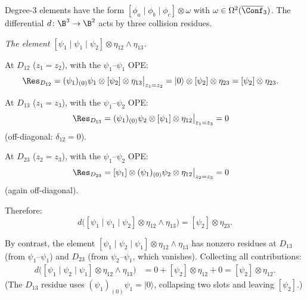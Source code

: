 \begin{computation}
\label{comp:fermion-deg3}
Degree-3 elements have the form
$[\phi_a \mid \phi_b \mid \phi_c] \otimes \omega$
with $\omega \in \Omega^2(\overline{\Conf}_3)$.
The differential $d\colon \B^3 \to \B^2$ acts by three collision residues.

\emph{The element $[\psi_1 \mid \psi_1 \mid \psi_2]
\otimes \eta_{12} \wedge \eta_{13}$.}

At $D_{12}$ ($z_1 = z_2$), with the $\psi_1$--$\psi_1$ OPE:
\begin{align*}
\Res_{D_{12}} &= (\psi_1)_{(0)}\psi_1 \otimes [\psi_2]
\otimes \eta_{13}\big|_{z_1 = z_2}
= |0\rangle \otimes [\psi_2] \otimes \eta_{23}
= [\psi_2] \otimes \eta_{23}.
\end{align*}

At $D_{13}$ ($z_1 = z_3$), with the $\psi_1$--$\psi_2$ OPE:
\begin{align*}
\Res_{D_{13}} &= (\psi_1)_{(0)}\psi_2 \otimes [\psi_1]
\otimes \eta_{12}\big|_{z_1 = z_3}
= 0
\end{align*}
(off-diagonal: $\delta_{12} = 0$).

At $D_{23}$ ($z_2 = z_3$), with the $\psi_1$--$\psi_2$ OPE:
\begin{align*}
\Res_{D_{23}} &= [\psi_1] \otimes (\psi_1)_{(0)}\psi_2
\otimes \eta_{12}\big|_{z_2 = z_3}
= 0
\end{align*}
(again off-diagonal).

Therefore:
\begin{equation}\label{eq:fermion-deg3-ex}
d\bigl([\psi_1 \mid \psi_1 \mid \psi_2]
\otimes \eta_{12} \wedge \eta_{13}\bigr)
= [\psi_2] \otimes \eta_{23}.
\end{equation}

By contrast, the element $[\psi_1 \mid \psi_2 \mid \psi_1]
\otimes \eta_{12} \wedge \eta_{13}$ has nonzero residues at
$D_{13}$ (from $\psi_1$--$\psi_1$) and $D_{23}$ (from $\psi_2$--$\psi_1$,
which vanishes).  Collecting all contributions:
\begin{align*}
d\bigl([\psi_1 \mid \psi_2 \mid \psi_1]
\otimes \eta_{12} \wedge \eta_{13}\bigr)
&= 0 + [\psi_2] \otimes \eta_{12} + 0
= [\psi_2] \otimes \eta_{12}.
\end{align*}
(The $D_{13}$ residue uses $(\psi_1)_{(0)}\psi_1 = |0\rangle$,
collapsing two slots and leaving $[\psi_2]$.)
\end{computation}

